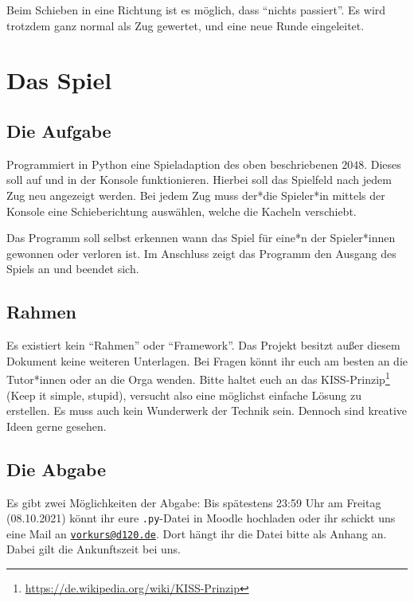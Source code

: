 \documentclass[ngerman,accentcolor=3c,colorbacktitle,12pt,T1]{tudaexercise}
\begin{document}
Beim Schieben in eine Richtung ist es möglich, dass \enquote{nichts passiert}.
Es wird trotzdem ganz normal als Zug gewertet, und eine neue Runde eingeleitet.


\section*{Das Spiel}
\subsection*{Die Aufgabe}
Programmiert in Python eine Spieladaption des oben beschriebenen $2048$.
Dieses soll auf und in der Konsole funktionieren.
Hierbei soll das Spielfeld nach jedem Zug neu angezeigt werden.
Bei jedem Zug muss der*die Spieler*in mittels der Konsole eine Schieberichtung auswählen, welche die Kacheln verschiebt.

Das Programm soll selbst erkennen wann das Spiel für eine*n der Spieler*innen gewonnen oder verloren ist.
Im Anschluss zeigt das Programm den Ausgang des Spiels an und beendet sich.

\subsection*{Rahmen}
Es existiert kein \enquote{Rahmen} oder \enquote{Framework}.
Das Projekt besitzt außer diesem Dokument keine weiteren Unterlagen.
Bei Fragen könnt ihr euch am besten an die Tutor*innen oder an die Orga wenden.
Bitte haltet euch an das KISS-Prinzip\footnote[2]{\url{https://de.wikipedia.org/wiki/KISS-Prinzip}} (Keep it simple, stupid), versucht also eine möglichst einfache Lösung zu erstellen.
Es muss auch kein Wunderwerk der Technik sein.
Dennoch sind kreative Ideen gerne gesehen.

\subsection*{Die Abgabe}
Es gibt zwei Möglichkeiten der Abgabe: Bis spätestens 23:59 Uhr am Freitag (08.10.2021) könnt ihr eure \texttt{.py}-Datei in Moodle hochladen oder ihr schickt uns eine Mail an \href{mailto:vorkurs@d120.de}{\nolinkurl{vorkurs@d120.de}}.
Dort hängt ihr die Datei bitte als Anhang an.
Dabei gilt die Ankunftszeit bei uns.
\end{document}
